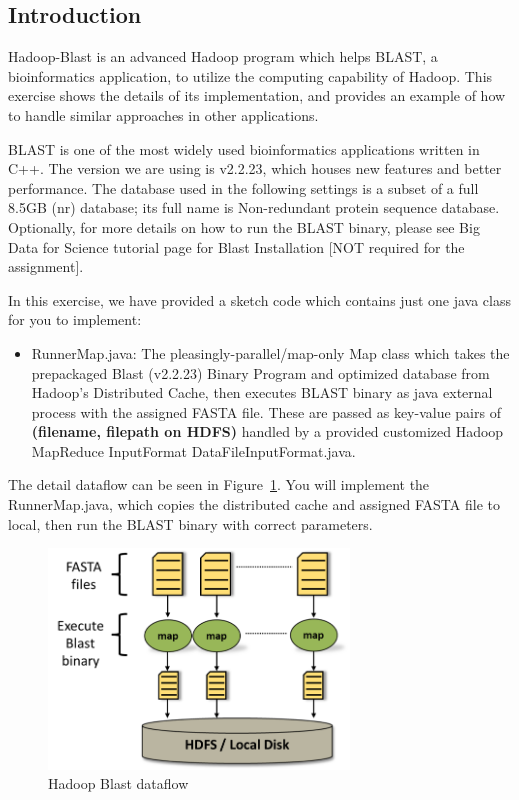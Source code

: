 \subsection*{Introduction}   

Hadoop-Blast is an advanced Hadoop program which helps BLAST, a bioinformatics
application, to utilize the computing capability of Hadoop. This exercise shows
the details of its implementation, and provides an example of how to handle
similar approaches in other applications.

BLAST is one of the most widely used bioinformatics applications written in
C++. The version we are using is v2.2.23, which houses new features and better
performance. The database used in the following settings is a subset of a full
8.5GB (nr) database; its full name is Non-redundant protein sequence database.
Optionally, for more details on how to run the BLAST binary, please see Big
Data for Science tutorial page for Blast Installation [NOT required for the
assignment].

In this exercise, we have provided a sketch code which contains just one java
class for you to implement:

\begin{itemize}
\item RunnerMap.java: The pleasingly-parallel/map-only Map class which takes
the prepackaged Blast (v2.2.23) Binary Program and optimized database from
Hadoop's Distributed Cache, then executes BLAST binary as java external process
with the assigned FASTA file. These are passed as key-value pairs of
\textbf{(filename, filepath on HDFS)} handled by a provided customized Hadoop
MapReduce InputFormat DataFileInputFormat.java.  
\end{itemize}

The detail dataflow can be seen in Figure~\ref{fig:blastdataflow}. You will
implement the RunnerMap.java, which copies the distributed cache and assigned
FASTA file to local, then run the BLAST binary with correct parameters.

\begin{figure}[!htbp]
\centering
\includegraphics[width=8cm]{section/icloud/assignment/problems/project3/blastdataflow}
\caption{Hadoop Blast dataflow}
\label{fig:blastdataflow}
\end{figure}

